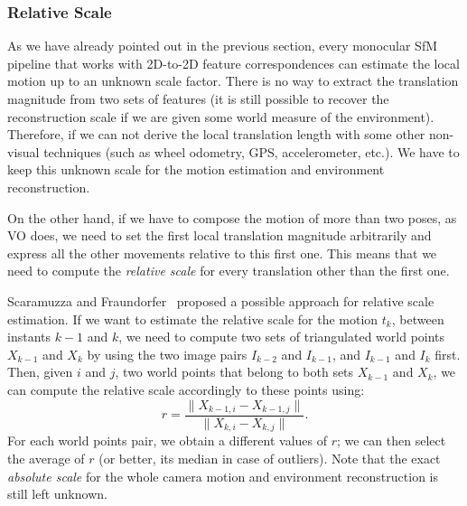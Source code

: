 \subsubsection{Relative Scale}
As we have already pointed out in the previous section, every monocular SfM 
pipeline that works with 2D-to-2D feature correspondences can estimate the 
local motion up to an unknown scale factor. There is no way to extract 
the translation magnitude from two sets of features (it is still possible 
to recover the reconstruction scale if we are given some world measure of the
environment).
Therefore, if we can not derive the local translation length with some other
non-visual techniques (such as wheel odometry, GPS, accelerometer, etc.).
We have to keep this unknown scale for the motion estimation and 
environment reconstruction.

On the other hand, if we have to compose the motion of more than two poses, 
as VO does, we need to set the first local translation magnitude 
arbitrarily and express all the other movements relative to this first one.
This means that we need to compute the \textit{relative scale}
for every translation other than the first one.

Scaramuzza and Fraundorfer~\cite{scaramuzzaVisualOdometryI} proposed a possible approach for relative scale estimation. If we want to estimate the relative scale for 
the motion $t_k$, between instants $k-1$ and $k$, we need to compute 
two sets of triangulated world points $X_{k-1}$ and $X_{k}$ by using 
the two image pairs $I_{k-2}$ and $I_{k-1}$, and $I_{k-1}$ and $I_{k}$ first. 
Then, given $i$ and $j$, two world points that belong to both sets $X_{k-1}$ and 
$X_{k}$, we can compute the relative scale accordingly to these points using:
%
\begin{equation}
	\label{eq:relative_scale}
	r = \frac{\| X_{k-1, i} - X_{k - 1, j} \|}{\| X_{k, i} - X_{k, j} \|}
	\text{.}
\end{equation}
%
\noindent For each world points pair, we obtain a different values of $r$;
we can then select the average of $r$ (or better, its median in case of 
outliers).
%
Note that the exact \textit{absolute scale} for the whole 
camera motion and environment reconstruction is still left unknown.

